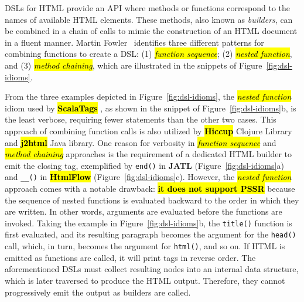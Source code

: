\documentclass[software,article,accept,pdftex,moreauthors]{Definitions/mdpi}
\begin{document}
DSLs for HTML provide an API where methods or functions correspond to the names
of available HTML elements. These methods, also known as \textit{builders}, can
be combined in a chain of calls to mimic the construction of an HTML document
in a fluent manner. Martin Fowler~\cite{dslbook} identifies three different
patterns for combining functions to create a DSL: (1) \textit{\hl{function
  sequence}}; (2) \textit{\hl{nested function}}, and (3) \textit{\hl{method chaining}}, which
are illustrated in the snippets of Figure~\ref{fig:dsl-idioms}.

From the three examples depicted in Figure~\ref{fig:dsl-idioms}, the
\textit{\hl{nested function}} idiom used by \textbf{\hl{ScalaTags}%
}, as shown in the
snippet of Figure~\ref{fig:dsl-idioms}b, is the least verbose, requiring
fewer statements than the other two cases. This approach of combining function
calls is also utilized by \textbf{\hl{Hiccup}} Clojure Library and \textbf{\hl{j2html}}
Java library. One reason for verbosity in \textit{\hl{function sequence}} and
\textit{\hl{method chaining}} approaches is the requirement of a dedicated HTML
builder to emit the closing tag, exemplified by \texttt{end()} in \textbf{JATL}
(Figure~\ref{fig:dsl-idioms}a) and \texttt{\_\_()} in \textbf{\hl{HtmlFlow}}
(Figure~\ref{fig:dsl-idioms}c). However, the \textit{\hl{nested function}} approach
comes with a notable drawback: \textbf{\hl{it does not support PSSR}} because the
sequence of nested functions is evaluated backward to the order in which they
are written. In other words, arguments are evaluated before the functions are
invoked. Taking the example in Figure~\ref{fig:dsl-idioms}b, the
\texttt{title()} function is first evaluated, and its resulting paragraph
becomes the argument for the \texttt{head()} call, which, in turn, becomes the
argument for \texttt{html()}, and so on. If HTML is emitted as functions are
called, it will print tags in reverse order. The aforementioned DSLs must
collect resulting nodes into an internal data structure, which is later
traversed to produce the HTML output. Therefore, they cannot progressively emit
the output as builders are called.
\end{document}

